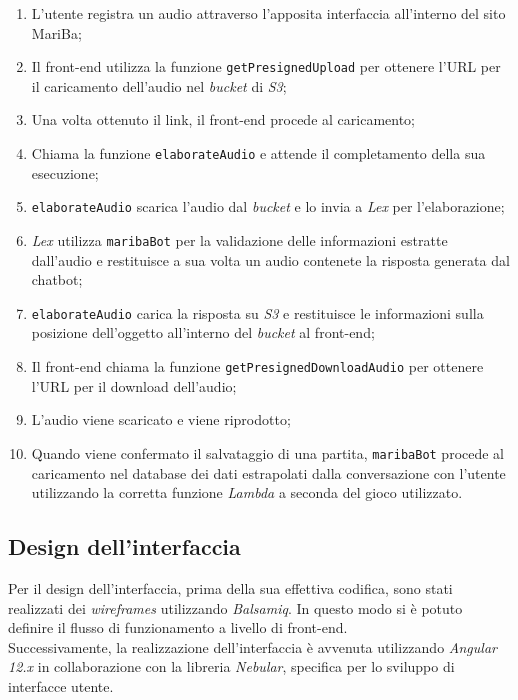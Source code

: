 	\begin{enumerate}
		\item L'utente registra un audio attraverso l'apposita interfaccia all'interno del sito MariBa;
		\item Il front-end utilizza la funzione \texttt{getPresignedUpload} per ottenere l'URL per il caricamento dell'audio nel \emph{bucket} di \emph{S3};
		\item Una volta ottenuto il link, il front-end procede al caricamento;
		\item Chiama la funzione \texttt{elaborateAudio} e attende il completamento della sua esecuzione;
		\item \texttt{elaborateAudio} scarica l'audio dal \emph{bucket} e lo invia a \emph{Lex} per l'elaborazione;
		\item \emph{Lex} utilizza \texttt{maribaBot} per la validazione delle informazioni estratte dall'audio e restituisce a sua volta un audio contenete la risposta generata dal \gls{chatbot};
		\item \texttt{elaborateAudio} carica la risposta su \emph{S3} e restituisce le informazioni sulla posizione dell'oggetto all'interno del \emph{bucket} al front-end;
		\item Il front-end chiama la funzione \texttt{getPresignedDownloadAudio} per ottenere l'URL per il download dell'audio;
		\item L'audio viene scaricato e viene riprodotto;
		\item Quando viene confermato il salvataggio di una partita, \texttt{maribaBot} procede al caricamento nel database dei dati estrapolati dalla conversazione con l'utente utilizzando la corretta funzione \emph{Lambda} a seconda del gioco utilizzato.
	\end{enumerate}
	
	\subsection{Design dell'interfaccia}
	Per il design dell'interfaccia, prima della sua effettiva codifica, sono stati realizzati dei \emph{wireframes} utilizzando \emph{Balsamiq}. In questo modo si è potuto definire il flusso di funzionamento a livello di front-end. \\ 
	
	\noindent Successivamente, la realizzazione dell'interfaccia è avvenuta utilizzando \emph{Angular 12.x} in collaborazione con la libreria 
	\emph{Nebular}, specifica per lo sviluppo di interfacce utente. \\
	
